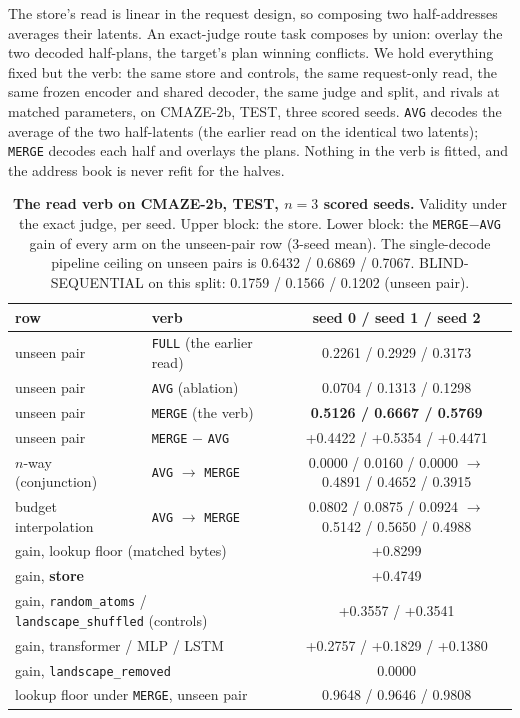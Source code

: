 \documentclass{article} %
\begin{document}
The store's read is linear in the request design, so composing two half-addresses averages
their latents. An exact-judge route task composes by union: overlay the two decoded half-plans,
the target's plan winning conflicts. We hold everything fixed but the verb: the same store and
controls, the same request-only read, the same frozen encoder and shared decoder, the same
judge and split, and rivals at matched parameters, on CMAZE-2b, TEST, three scored seeds.
\texttt{AVG} decodes the average of the two half-latents (the earlier read on the identical two
latents); \texttt{MERGE} decodes each half and overlays the plans. Nothing in the verb is
fitted, and the address book is never refit for the halves. %

\begin{table}[t]
\centering\small
\caption{\textbf{The read verb on CMAZE-2b, TEST, $n=3$ scored seeds.} Validity under the exact
judge, per seed. Upper block: the store. Lower block: the \texttt{MERGE}$-$\texttt{AVG} gain of
every arm on the unseen-pair row (3-seed mean). The single-decode pipeline ceiling on unseen
pairs is 0.6432 / 0.6869 / 0.7067. BLIND-SEQUENTIAL on this split: 0.1759 / 0.1566 / 0.1202
(unseen pair).}
\label{tab:verb}
\setlength{\tabcolsep}{3pt}
\begin{tabular}{llc}
\toprule
row & verb & seed 0 / seed 1 / seed 2 \\
\midrule
unseen pair & \texttt{FULL} (the earlier read) & 0.2261 / 0.2929 / 0.3173 \\
unseen pair & \texttt{AVG} (ablation) & 0.0704 / 0.1313 / 0.1298 \\
unseen pair & \texttt{MERGE} (the verb) & \textbf{0.5126 / 0.6667 / 0.5769} \\
unseen pair & \texttt{MERGE} $-$ \texttt{AVG} & +0.4422 / +0.5354 / +0.4471 \\
$n$-way (conjunction) & \texttt{AVG} $\to$ \texttt{MERGE} & 0.0000 / 0.0160 / 0.0000 $\to$ 0.4891 / 0.4652 / 0.3915 \\
budget interpolation & \texttt{AVG} $\to$ \texttt{MERGE} & 0.0802 / 0.0875 / 0.0924 $\to$ 0.5142 / 0.5650 / 0.4988 \\
\midrule
\multicolumn{2}{l}{gain, lookup floor (matched bytes)} & +0.8299 \\
\multicolumn{2}{l}{gain, \textbf{store}} & +0.4749 \\
\multicolumn{2}{l}{gain, \texttt{random\_atoms} / \texttt{landscape\_shuffled} (controls)} & +0.3557 / +0.3541 \\
\multicolumn{2}{l}{gain, transformer / MLP / LSTM} & +0.2757 / +0.1829 / +0.1380 \\
\multicolumn{2}{l}{gain, \texttt{landscape\_removed}} & 0.0000 \\
\multicolumn{2}{l}{lookup floor under \texttt{MERGE}, unseen pair} & 0.9648 / 0.9646 / 0.9808 \\
\bottomrule
\end{tabular}
\end{table}
\end{document}
